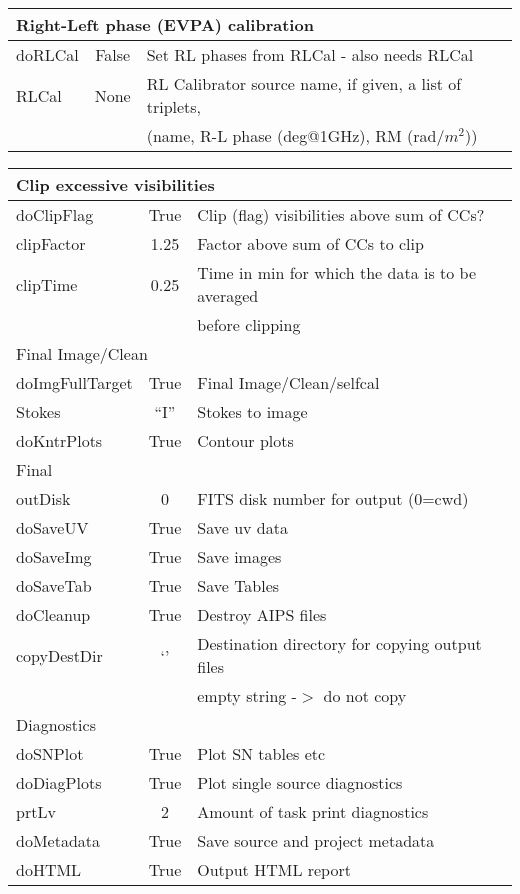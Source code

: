 \documentclass[11pt]{article}
\begin{document}
\begin{center}
\begin{tabular}{|l|c|l|}
\hline
\multicolumn{3}{|l|}{Right-Left phase (EVPA) calibration} \\
\hline
doRLCal & False & Set RL phases from RLCal - also needs RLCal \\
RLCal & None & RL Calibrator source name, if given, a list of triplets, \\
 & & (name, R-L phase (deg@1GHz), RM (rad/$m^{2}$)) \\

\hline
\end{tabular}
\end{center}
\clearpage
\begin{center}
\begin{tabular}{|l|c|l|}

\hline
\multicolumn{3}{|l|}{Clip excessive visibilities} \\
\hline
doClipFlag & True & Clip (flag) visibilities above sum of CCs? \\
clipFactor & 1.25 & Factor above sum of CCs to clip \\
clipTime & 0.25 & Time in min for which the data is to be averaged \\
 & & before clipping \\

\hline
\multicolumn{3}{|l|}{Final Image/Clean} \\
\hline
doImgFullTarget & True & Final Image/Clean/selfcal \\
Stokes & ``I'' & Stokes to image \\
doKntrPlots & True & Contour plots \\

\hline
\multicolumn{3}{|l|}{Final} \\
\hline
outDisk & 0 & FITS disk number for output (0=cwd) \\
doSaveUV & True & Save uv data \\
doSaveImg & True & Save images \\
doSaveTab & True & Save Tables \\
doCleanup & True & Destroy AIPS files \\
copyDestDir & `' & Destination directory for copying output files \\
 & & empty string -$>$ do not copy \\

\hline
\multicolumn{3}{|l|}{Diagnostics} \\
\hline
doSNPlot & True & Plot SN tables etc \\
doDiagPlots & True & Plot single source diagnostics \\
prtLv & 2 & Amount of task print diagnostics \\
doMetadata & True & Save source and project metadata \\
doHTML & True & Output HTML report \\
\hline

\end{tabular}
\end{center}
\end{document}
